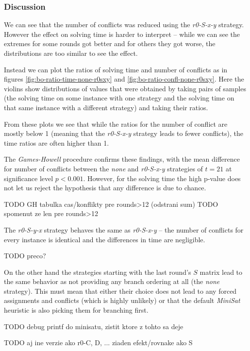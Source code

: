 \subsubsection{Discussion}
We can see that the number of conflicts was reduced using the \emph{r0-S-x-y} strategy.
However the effect on solving time is harder to interpret -- while we can see the extremes for some rounds got better and for others they got worse, the distributions are too similar to see the effect.

Instead we can plot the ratios of solving time and number of conflicts as in figures \ref{fig:bo-ratio-time-none-r0sxy} and \ref{fig:bo-ratio-confl-none-r0sxy}.
Here the violins show distributions of values that were obtained by taking pairs of samples (the solving time on some instance with one strategy and the solving time on that same instance with a different strategy) and taking their ratios.

From these plots we see that while the ratios for the number of conflict are mostly below 1 (meaning that the \emph{r0-S-x-y} strategy leads to fewer conflicts), the time ratios are often higher than 1.

The \emph{Games-Howell} procedure confirms these findings, with the mean difference for number of conflicts between the \emph{none} and \emph{r0-S-x-y} strategies of $t = 21$ at significance level $p < 0.001$.
However, for the solving time the high p-value does not let us reject the hypothesis that any difference is due to chance.

TODO GH tabulka cas/konflikty pre rounds>12 (odstrani sum)
TODO spomenut ze len pre rounds>12

The \emph{r0-S-y-x} strategy behaves the same as \emph{r0-S-x-y} -- the number of conflicts for every instance is identical and the differences in time are negligible.

TODO preco?

On the other hand the strategies starting with the last round's $S$ matrix lead to the same behavior as not providing any branch ordering at all (the \emph{none} strategy).
This must mean that either their choice does not lead to any forced assignments and conflicts (which is highly unlikely) or that the default \emph{MiniSat} heuristic is also picking them for branching first.

TODO debug printf do minisatu, zistit ktore z tohto sa deje

TODO aj ine verzie ako r0-C, D, ... ziaden efekt/rovnake ako S
	
